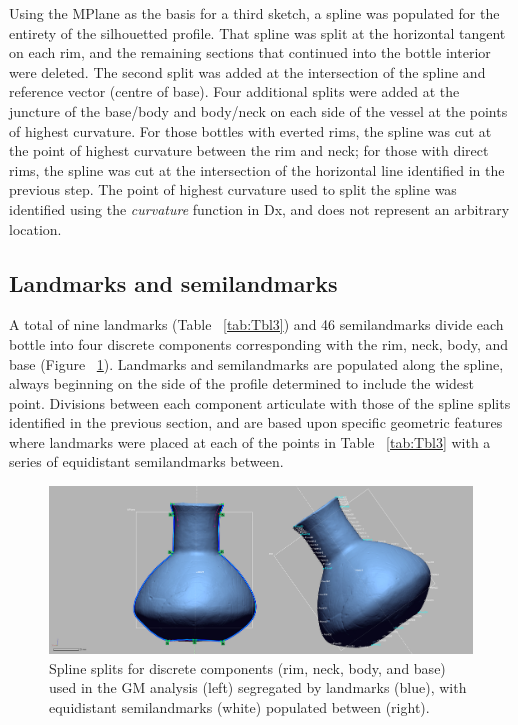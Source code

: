 \documentclass[review]{elsarticle}
\begin{document}
Using the MPlane as the basis for a third sketch, a spline was populated for the entirety of the silhouetted profile. That spline was split at the horizontal tangent on each rim, and the remaining sections that continued into the bottle interior were deleted. The second split was added at the intersection of the spline and reference vector (centre of base). Four additional splits were added at the juncture of the base/body and body/neck on each side of the vessel at the points of highest curvature. For those bottles with everted rims, the spline was cut at the point of highest curvature between the rim and neck; for those with direct rims, the spline was cut at the intersection of the horizontal line identified in the previous step. The point of highest curvature used to split the spline was identified using the \textit{curvature} function in Dx, and does not represent an arbitrary location.

\subsection{Landmarks and semilandmarks}

A total of nine landmarks (Table ~\ref{tab:Tbl3}) and 46 semilandmarks divide each bottle into four discrete components corresponding with the rim, neck, body, and base (Figure ~\ref{fig:Fig1a-845}). Landmarks and semilandmarks are populated along the spline, always beginning on the side of the profile determined to include the widest point. Divisions between each component articulate with those of the spline splits identified in the previous section, and are based upon specific geometric features where landmarks were placed at each of the points in Table ~\ref{tab:Tbl3} with a series of equidistant semilandmarks between. 

\begin{figure}[htbp]\centering
\includegraphics[width=\linewidth]{FigSSLM}
\caption{Spline splits for discrete components (rim, neck, body, and base) used in the GM analysis (left) segregated by landmarks (blue), with equidistant semilandmarks (white) populated between (right).}
\label{fig:Fig1a-845}
\end{figure}
\end{document}
